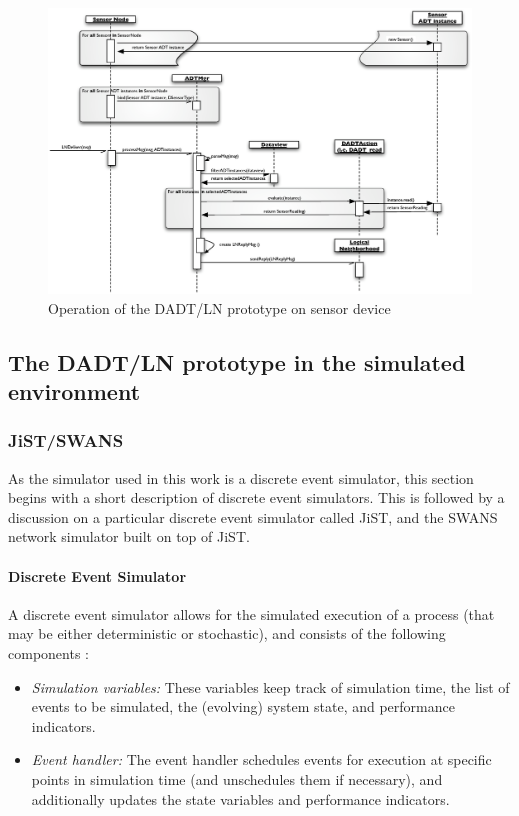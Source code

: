 \begin{figure}
\centering
\includegraphics[width=\textwidth]{img/SeqDiagram_Sensornode.eps}
\caption[Operation of the DADT/LN prototype on sensor device]{Operation of the DADT/LN prototype on sensor device}
\label{Fig:SeqDiagram_PCnode}
\end{figure}

\subsection{The DADT/LN prototype in the simulated environment}
\subsubsection {JiST/SWANS} \label{sec:jistswans}

As the simulator used in this work is a discrete event simulator, this section 
begins with a short description of discrete event simulators. 
This is followed by a discussion on a particular discrete event simulator
called JiST, and the SWANS network simulator built on top of JiST.

\paragraph{Discrete Event Simulator}

A discrete event simulator allows for the simulated execution of a process (that
may be either deterministic or stochastic), and consists of the following
components \cite{Shankar_DiscreteEventSim}:

\begin{itemize}
  \item \emph{Simulation variables:} These variables keep track of simulation 
  time, the list of events to be simulated, the (evolving) system state, and 
  performance indicators.
  \item \emph{Event handler:} The event handler schedules events for execution 
  at specific points in simulation time (and unschedules them if necessary), 
  and additionally updates the state variables and performance indicators.
\end{itemize}
 
